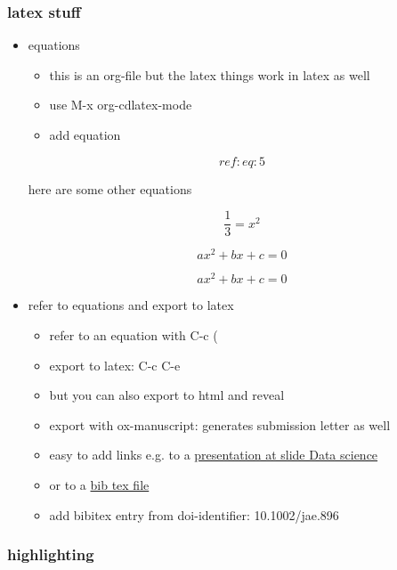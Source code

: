 \documentclass[11pt]{article}
\begin{document}
\subsubsection*{latex stuff}
\label{sec:org837b86d}
\begin{itemize}
\item equations
\label{sec:org5651b1a}
\begin{itemize}
\item this is an org-file but the latex things work in latex as well
\item use M-x org-cdlatex-mode
\item add equation
\end{itemize}

\begin{equation}
\label{eq:2}
ref:eq:5
\end{equation}

here are some other equations

\begin{equation}
\label{eq:4}
\frac{1}{3} = x^2
\end{equation}

\begin{equation}
\label{eq:5}
ax^2+bx+c=0
\end{equation}

\begin{equation}
\label{eq:6}
ax^2+bx+c=0
\end{equation}

\item refer to equations and export to latex
\label{sec:org9af59bb}
\begin{itemize}
\item refer to an equation with C-c (
\item export to latex: C-c C-e
\item but you can also export to html and reveal
\item export with ox-manuscript: generates submission letter as well

\item easy to add links e.g. to a \href{econometrics.org}{presentation at slide Data science}
\item or to a \href{bibtexfile.bib}{bib tex file}
\item add bibitex entry from doi-identifier: 10.1002/jae.896
\end{itemize}
\end{itemize}
\subsubsection*{highlighting}
\label{sec:org940a133}
\end{document}
